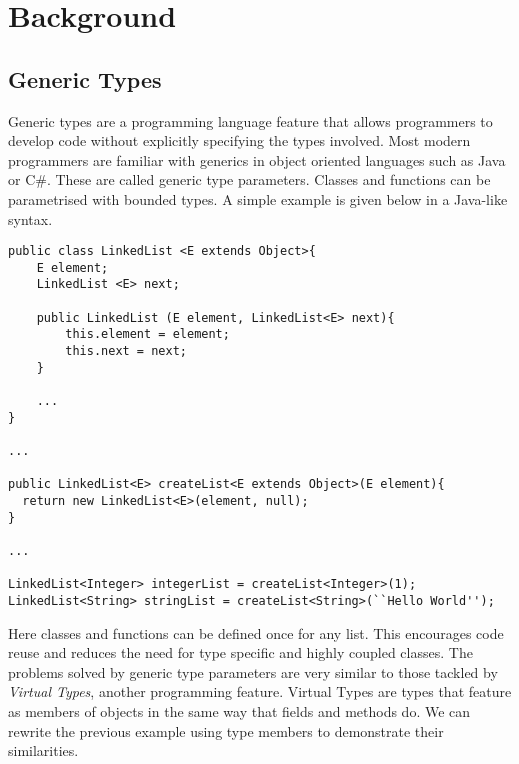 \documentclass[11pt
              , a4paper
              , twoside
              , openright
              ]{report}
\begin{document}
\chapter{Background}\label{ch:background}

\section{Generic Types}
Generic types are a programming language feature that allows programmers to develop code without explicitly specifying the types involved. Most modern programmers are familiar with generics in object oriented languages such as Java or C\#. These are called generic type parameters. Classes and functions can be parametrised with bounded types. A simple example is given below in a Java-like syntax.
\begin{lstlisting}[mathescape, style=custom_lang]
public class LinkedList <E extends Object>{
	E element;
	LinkedList <E> next;
	
	public LinkedList (E element, LinkedList<E> next){
		this.element = element;
		this.next = next;
	}
	
	...
}

...

public LinkedList<E> createList<E extends Object>(E element){
  return new LinkedList<E>(element, null);
}

...

LinkedList<Integer> integerList = createList<Integer>(1);  
LinkedList<String> stringList = createList<String>(``Hello World'');
\end{lstlisting}
Here classes and functions can be defined once for any list. This encourages code reuse and reduces the need for type specific and highly coupled classes. The problems solved by generic type parameters are very similar to those tackled by \emph{Virtual Types}, another programming feature.  Virtual Types are types that feature as members of objects in the same way that fields and methods do. We can rewrite the previous example using type members to demonstrate their similarities.
\end{document}
